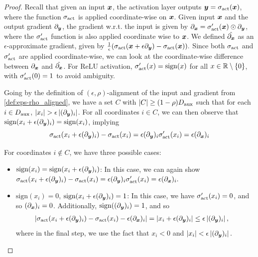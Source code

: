 \firstorderactbckproprelu*
\begin{proof}
    Recall that given an input ${\bm{x}}$, the activation layer outputs ${\bm{y}} = \sigma_{\textrm{act}}({\bm{x}})$, where the function $\sigma_{\textrm{act}}$ is applied coordinate-wise on ${\bm{x}}$. Given input ${\bm{x}}$ and the output gradient $\partial_{{\bm{y}}}$, the gradient w.r.t. the input is given by $\partial_{{\bm{x}}} = \sigma_{\textrm{act}}'({\bm{x}}) \odot \partial_{{\bm{y}}}$, where the $\sigma_{\textrm{act}}'$ function is also applied coordinate wise to ${\bm{x}}$. We defined $\Hat{\partial_{{\bm{x}}}}$ as an $\epsilon$-approximate gradient, given by $\frac{1}{\epsilon} ( \sigma_{\textrm{act}}({\bm{x}} + \epsilon \partial_{{\bm{y}}}) - \sigma_{\textrm{act}}({\bm{x}} ) ).$ Since both $\sigma_{\textrm{act}}$ and $\sigma_{\textrm{act}}'$ are applied coordinate-wise, we can look at the coordinate-wise difference between $\partial_{{\bm{x}}}$ and $\Hat{\partial_{{\bm{x}}}}$. For $\mathrm{ReLU}$ activation, $\sigma_{\textrm{act}}'(x) = \mathrm{sign}(x)$ for all $x \in \mathbb{R} \setminus \{0\}$, with $\sigma_{\textrm{act}}'(0) = 1$ to avoid ambiguity. 
    
    Going by the definition of $(\epsilon, \rho)$-alignment of the input and gradient from \cref{def:eps-rho_aligned}, we have a set $C$ with $\left| C \right| \ge (1-\rho) D_{\text{aux}}$ such that for each $i \in D_{\text{aux}}$, $\left| x_i \right| > \epsilon  \left| (\partial_{{\bm{y}}})_i \right|$. For all coordinates $i \in C$, we can then observe that $\mathrm{sign} (x_i + \epsilon (\partial_{{\bm{y}}})_i) = \mathrm{sign} (x_i)$, implying 
    $$
    \sigma_{\textrm{act}}( x_i + \epsilon (\partial_{{\bm{y}}})_i ) - \sigma_{\textrm{act}}( x_i ) = \epsilon (\partial_{{\bm{y}}})_i \sigma_{\textrm{act}}'(x_i) = \epsilon (\partial_{{\bm{x}}})_i
    $$

    
    For coordinates $i \notin C$, we have three possible cases:
    \begin{itemize}
        \item $\mathrm{sign} (x_i) = \mathrm{sign} (x_i + \epsilon (\partial_{{\bm{y}}})_i ) $: In this case, we can again show $\sigma_{\textrm{act}}( x_i + \epsilon (\partial_{{\bm{y}}})_i ) - \sigma_{\textrm{act}}( x_i ) = \epsilon (\partial_{{\bm{y}}})_i \sigma_{\textrm{act}}'(x_i) = \epsilon (\partial_{{\bm{x}}})_i.$

        \item $\mathrm{sign} (x_i) = 0$, $\mathrm{sign} (x_i + \epsilon (\partial_{{\bm{y}}})_i ) = 1$: In this case, we have $\sigma_{\textrm{act}}'(x_i) = 0$, and so $(\partial_{{\bm{x}}})_i = 0$. Additionally, $\mathrm{sign} ( (\partial_{{\bm{y}}})_i ) = 1$, and so
        \begin{align*}
        \left|  \sigma_{\textrm{act}}( x_i + \epsilon (\partial_{{\bm{y}}})_i ) - \sigma_{\textrm{act}}( x_i ) - \epsilon (\partial_{{\bm{x}}})_i  \right| &= \left|  x_i + \epsilon (\partial_{{\bm{y}}})_i \right| 
        \leq \epsilon \left|   (\partial_{{\bm{y}}})_i  \right|,
        \end{align*}
        where in the final step, we use the fact that $x_i < 0$ and $\left| x_i \right| < \epsilon \left|  (\partial_{{\bm{y}}})_i  \right|.$ 
        

\end{itemize}
\end{proof}
